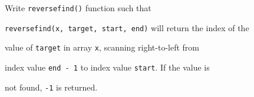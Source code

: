 Write \texttt{reversefind()} function such that

\texttt{reversefind(x, target, start, end)} will return the index of the

value of \texttt{target} in array \texttt{x}, scanning right-to-left from

index value \texttt{end - 1} to index value \texttt{start}. If the value is

not found, \texttt{-1} is returned.

